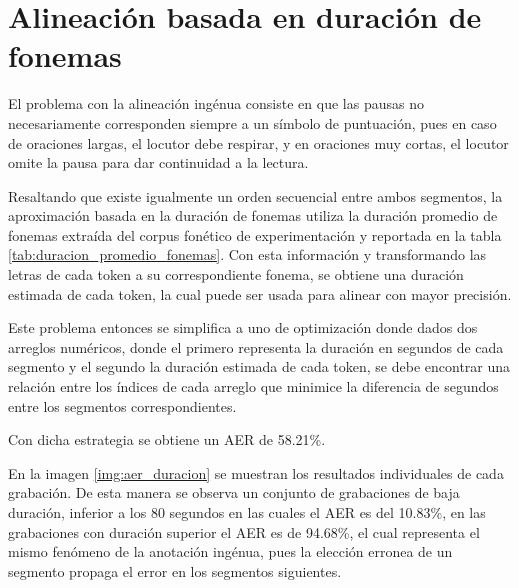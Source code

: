 

\section{Alineación basada en duración de fonemas}

El problema con la alineación ingénua consiste en que las pausas no necesariamente corresponden siempre a un símbolo de puntuación, pues en caso de oraciones largas, el locutor debe respirar, y en oraciones muy cortas, el locutor omite la pausa para dar continuidad a la lectura.

Resaltando que existe igualmente un orden secuencial entre ambos segmentos, la aproximación basada en la duración de fonemas utiliza la duración promedio de fonemas extraída del corpus fonético de experimentación y reportada en la tabla \ref{tab:duracion_promedio_fonemas}. Con esta información y transformando las letras de cada token a su correspondiente fonema, se obtiene una duración estimada de cada token, la cual puede ser usada para alinear con mayor precisión.





Este problema entonces se simplifica a uno de optimización donde dados dos arreglos numéricos, donde el primero representa la duración en segundos de cada segmento y el segundo la duración estimada de cada token, se debe encontrar una relación entre los índices de cada arreglo que minimice la diferencia de segundos entre los segmentos correspondientes. 

Con dicha estrategia se obtiene un AER de 58.21\%.

En la imagen \ref{img:aer_duracion} se muestran los resultados individuales de cada grabación. De esta manera se observa un conjunto de grabaciones de baja duración, inferior a los 80 segundos en las cuales el AER es del 10.83\%, en las grabaciones con duración superior el AER es de 94.68\%, el cual representa el mismo fenómeno de la anotación ingénua, pues la elección erronea de un segmento propaga el error en los segmentos siguientes.

